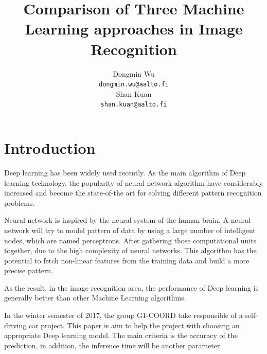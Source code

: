 \documentclass[article]{aaltoseries}
\begin{document}
 

\title{Comparison of Three Machine Learning approaches in Image Recognition}

\author{Dongmin Wu
\\\textnormal{\texttt{dongmin.wu@aalto.fi}}
\\
Shan Kuan
\\\textnormal{\texttt{shan.kuan@aalto.fi}}
} %


\maketitle


\pagebreak



\section{Introduction}


Deep learning has been widely used recently. As the main algorithm of Deep learning technology,
the popularity of neural network algorithm 
have considerably increased and become the state-of-the art for solving different pattern recognition
problems.

Neural network is inspired by the neural system of the human brain. A neural network will 
try to model pattern of data by using a large number of intelligent nodes, which are named perceptrons. 
After gathering those computational units together, due to the high complexity of neural networks. 
This algorithm has the potential to fetch non-linear features from the training data 
and build a more precise pattern.

As the result, in the image recognition area, the performance of Deep learning is generally better than
other Machine Learning algorithms.  

In the winter semester of 2017, the group G1-COORD take responsible of a self-driving car project. 
This paper is aim to help the project with choosing an appropriate Deep learning model. The main 
criteria is the accuracy of the prediction, in addition, the inference time will be another 
parameter.
\end{document}
